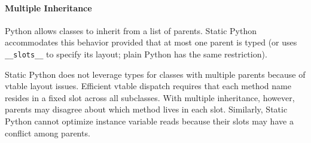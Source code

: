 \documentclass[english,cleveref,crc]{programming}
\newcommand{\SP}{Static Python}
\newcommand{\code}[1]{\texttt{#1}}
\begin{document}
\paragraph{Multiple Inheritance}


Python allows classes to inherit from a list of parents.
\SP{} accommodates this behavior provided that at most one parent
is typed (or uses \code{\_\_slots\_\_} to specify its layout; plain Python has the same restriction).

\SP{} does not leverage types for classes with multiple parents
because of vtable layout issues.
Efficient vtable dispatch requires that each method name
resides in a fixed slot across all subclasses.
With multiple inheritance, however, parents may disagree about which method
lives in each slot.
Similarly, \SP{} cannot optimize instance variable reads because their slots
may have a conflict among parents.
\end{document}

